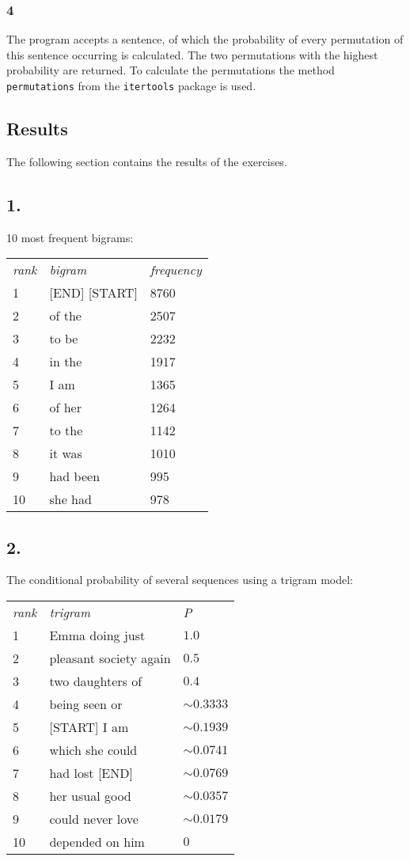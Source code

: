 \documentclass[a4paper, 10pt]{article}
\begin{document}
\subsubsection*{4}
The program accepts a sentence, of which the probability of every permutation of this sentence occurring is calculated. The two permutations with the highest probability are returned. To calculate the permutations the method \texttt{permutations} from the \texttt{itertools} package is used.

\subsection{Results}  
The following section contains the results of the exercises.             
\subsection*{1.}
10 most frequent bigrams: \\
\begin{tabular}{l l l}
\textit{rank}&	\textit{bigram}	& \textit{frequency} \\
1	&	[END] [START]	& 8760\\
2	&	of the			& 2507\\
3	&	to be			& 2232\\
4	&	in the			& 1917\\
5	&	I am			& 1365\\
6	&	of her			& 1264\\
7	&	to the			& 1142\\
8	&	it was			& 1010\\
9	&	had been		& 995\\
10	&	she had			& 978\\
\end{tabular}

\subsection*{2.}
The conditional probability of several sequences using a trigram model: \\
\begin{tabular}{l l l}
\textit{rank}&	\textit{trigram}	& \textit{P} \\
1	&	Emma doing just			&	 $1.0$\\
2	&	pleasant society again	&	 $0.5$\\
3	&	two daughters of		&	 $0.4$\\
4	&	being seen or			&	 $\sim 0.3333$\\
5	&	[START] I am			&	 $\sim 0.1939$\\
6	&	which she could			&	 $\sim 0.0741$\\
7	&	had lost [END]			&	 $\sim 0.0769$\\
8	&	her usual good			&	 $\sim 0.0357$\\
9	&	could never love		&	 $\sim 0.0179$\\
10	&	depended on him			&	 $0$\\
\end{tabular}
\end{document}
